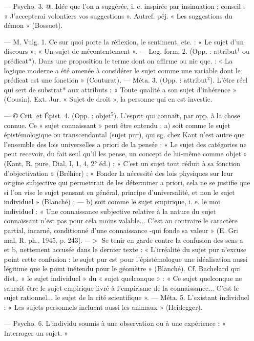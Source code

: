 \begin{itemize}[leftmargin=1cm, label=, itemsep=1pt]
— Psycho. 3. @. Idée que l’on a
suggérée, i. e. inspirée par insinuation ;
conseil : « J’accepterai volontiers
vos suggestions ». Autref. péj.
« Les suggestions du démon » (Bossuet).

 — M. Vulg. 1. Ce sur quoi porte
la réflexion, le sentiment, etc. : « Le
sujet d’un discours »; « Un sujet de
mécontentement ». — Log. form.
2. (Opp. : attribut$^1$ ou prédicat*).
Dans une proposition le terme
dont on affirme ou nie qqc. : « La
logique moderne a été amenée à
considérer le sujet comme une variable dont le prédicat est une fonction » (Couturat). — Méta. 3. (Opp. :
attribut$^2$). L'être réel qui sert de
substrat* aux attributs : « Toute
qualité a son sujet d’inhérence »
(Cousin). Ext. Jur. « Sujet de droit »,
la personne qui en est investie.

— © Crit. et Épist. 4. (Opp. :
objet$^5$). L'esprit qui connaît, par
opp. à la chose connue. Ce « sujet
connaissant » peut être entendu :
a) soit comme le sujet épistémologique ou transcendantal (sujet pur),
qui sg. chez Kant n’est autre que
l’ensemble des lois universelles a
priori de la pensée : « Le sujet des
catégories ne peut recevoir, du fait
seul qu'il les pense, un concept de
lui-même comme objet » (Kant,
R. pure, Dial, I, 1, 4, 2° éd.) ;
« C’est un sujet tout réduit à sa
fonction d’objectivation » (Bréhier) ;
« Fonder la nécessité des lois physiques sur leur origine subjective
qui permettrait de les déterminer
a priori, cela ne se justifie que si l'on
vise le sujet pensant en général,
principe d'universalité, et non le
sujet individuel » (Blanché) ; —
b) soit comme le sujet empirique,
i. e. le moi individuel : « Une connaissance subjective relative à la
nature du sujet connaïssant n’est
pas pour cela moins valable... C'est
au contraire le caractère partial,
incarné, conditionné d’une connaissance -qui fonde sa valeur » (E. Gri
mal, R. ph., 1945, p. 243). $->$ Se
tenir en garde contre la confusion
des sens a et b, nettement accusée
dans le dernier texte : « L’irréalité
du sujet pur n’excuse point cette
confusion : le sujet pur est pour
l’épistémologue une  idéalisation
aussi légitime que le point inétendu
pour le géomètre » (Blanché). Cf.
Bachelard qui dist,. « le sujet individuel » du « sujet quelconque » :
« Ce sujet quelconque ne saurait
être le sujet empirique livré à l’empirisme de la connaissance... C'est le
sujet rationnel... le sujet de la cité
scientifique ». — Méta. 5. L’existant
individuel : « Les sujets personnels
incluent aussi les animaux » (Heidegger).

— Psycho. 6. L'individu soumis
à une observation ou à une expérience : « Interroger un sujet. »


\end{itemize}
